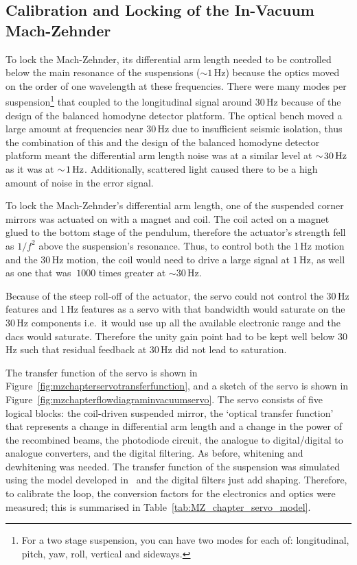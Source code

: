 \subsection{Calibration and Locking of the In-Vacuum Mach-Zehnder}
\label{sec:mz_chapter_in_vac_servo}
To lock the Mach-Zehnder, its differential arm length needed to be controlled below the main resonance of the suspensions ($\sim\!1$\,Hz) because the optics moved on the order of one wavelength at these frequencies. There were many modes per suspension\footnote{For a two stage suspension, you can have two modes for each of: longitudinal, pitch, yaw, roll, vertical and sideways.} that coupled to the longitudinal signal around 30\,Hz because of the design of the balanced homodyne detector platform. The optical bench moved a large amount at frequencies near 30\,Hz due to insufficient seismic isolation, thus the combination of this and the design of the balanced homodyne detector platform meant the differential arm length noise was at a similar level at $\sim\!30\,\rm{Hz}$ as it was at $\sim\!1\,\rm{Hz}$. Additionally, scattered light caused there to be a high amount of noise in the error signal.
\par
To lock the Mach-Zehnder's differential arm length, one of the suspended corner mirrors was actuated on with a magnet and coil. The coil acted on a magnet glued to the bottom stage of the pendulum, therefore the actuator's strength fell as $1/f^2$ above the suspension's resonance. Thus, to control both the 1\,Hz motion and the 30\,Hz motion, the coil would need to drive a large signal at $1$\,Hz, as well as one that was $~1000$ times greater at $\sim\!30$\,Hz. 
\par
Because of the steep roll-off of the actuator, the servo could not control the 30\,Hz features and 1\,Hz features as a servo with that bandwidth would saturate on the 30\,Hz components i.e.~it would use up all the available electronic range and the \glspl{dac} would saturate. Therefore the unity gain point had to be kept well below 30\,Hz such that residual feedback at 30\,Hz did not lead to saturation. 
\par
The transfer function of the servo is shown in Figure~\ref{fig:mzchapterservotransferfunction}, and a sketch of the servo is shown in Figure~\ref{fig:mzchapterflowdiagraminvacuumservo}. The servo consists of five logical blocks: the coil-driven suspended mirror, the `optical transfer function' that represents a change in differential arm length and a change in the power of the recombined beams, the photodiode circuit, the analogue to digital/digital to analogue converters, and the digital filtering. As before, whitening and dewhitening was needed. The transfer function of the suspension was simulated using the model developed in~\cite{Jans_thesis} and the digital filters just add shaping. Therefore, to calibrate the loop, the conversion factors for the electronics and optics were measured; this is summarised in Table~\ref{tab:MZ_chapter_servo_model}. 
